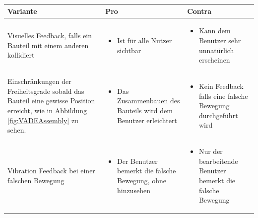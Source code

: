 \begin{center}
	\begin{tabularx} {\textwidth} { | B | B | B | }
		\hline
		\color{white} \textbf{Variante} & \color{white} \textbf{Pro} & 
		\color{white} \textbf{Contra} \\
		\hline
		\vspace{1pt}
		Visuelles Feedback, falls ein Bauteil mit einem anderen kollidiert & 
		\begin{itemize} [leftmargin=*,noitemsep,topsep=0pt]
			\item Ist für alle Nutzer sichtbar
		\end{itemize} &
		\begin{itemize} [leftmargin=*,noitemsep,topsep=0pt]
			\item Kann dem Benutzer sehr unnatürlich erscheinen
		\end{itemize} \\
		\hline
		\vspace{1pt}
		Einschränkungen der Freiheitsgrade sobald das Bauteil eine gewisse Position erreicht, wie in Abbildung \ref{fig:VADEAssembly} zu sehen. 
		\vspace{2pt} & 
		\begin{itemize} [leftmargin=*,noitemsep,topsep=0pt]
			\item Das Zusammenbauen des Bauteils wird dem Benutzer erleichtert
		\end{itemize} &
		\begin{itemize} [leftmargin=*,noitemsep,topsep=0pt]
			\item Kein Feedback falls eine falsche Bewegung durchgeführt wird
		\end{itemize} \\
		\hline
		\vspace{1pt}
		Vibration Feedback bei einer falschen Bewegung & 
		\begin{itemize} [leftmargin=*,noitemsep,topsep=0pt]
			\item Der Benutzer bemerkt die falsche Bewegung, ohne hinzusehen
		\end{itemize} &
		\begin{itemize} [leftmargin=*,noitemsep,topsep=0pt]
			\item Nur der bearbeitende Benutzer bemerkt die falsche Bewegung
		\end{itemize} \\
		\hline	
	\end{tabularx}
\end{center}
\label{tbl:varianten_zusammenbau}


